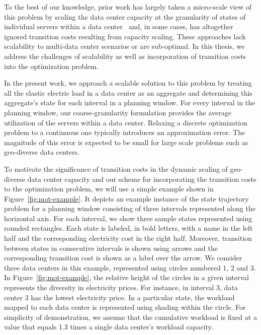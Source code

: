To the best of our knowledge, prior work has largely taken a micro-scale view of this problem by scaling the data center capacity at the granularity of states of individual servers within a data center~\cite{Li:Optimal:TSG:2012,LinInfocom11,serverEnergy,Mazzucco2012415,rao2010,qureshi2009cutting} and, in some cases, has altogether ignored transition costs resulting from capacity scaling. These approaches lack scalability to multi-data center scenarios or are sub-optimal. In this thesis, we address the challenges of scalability as well as incorporation of transition costs into the optimization problem.

In the present work, we approach a scalable solution to this problem by treating all the elastic electric load in a data center as an aggregate and determining this aggregate's state for each interval in a planning window. For every interval in the planning window, our coarse-granularity formulation provides the average utilization of the servers within a data center. Relaxing a discrete optimization problem to a continuous one typically introduces an approximation error. The magnitude of this error is expected to be small for large scale problems such as geo-diverse data centers. %

To motivate the significance of transition costs in the dynamic scaling of geo-diverse data center capacity and our scheme for incorporating the transition costs to the optimization problem, we will use a simple example shown in Figure~\ref{fig:mot-example}. It depicts an example instance of the
state trajectory problem for a planning window consisting of
three intervals represented along the horizontal axis. For each interval, we show three sample states represented using rounded rectangles. Each state is labeled, in bold letters, with a name in the left half and the corresponding electricity cost in the right half. Moreover, transition between states in consecutive intervals is shown using arrows and the corresponding transition cost is shown as a label over the arrow. We consider three data centers in this example, represented using circles
numbered 1, 2 and 3. In Figure~\ref{fig:mot-example}, the relative height of the circles in a given interval represents the diversity in electricity prices. For instance, in interval 3, data center 3 has the lowest electricity price. In a particular state, the workload mapped to each data center is represented using shading within the circle. For simplicity of demonstration, we assume that the cumulative
workload is fixed at a value that equals 1.3 times a single
data center's workload capacity. 


